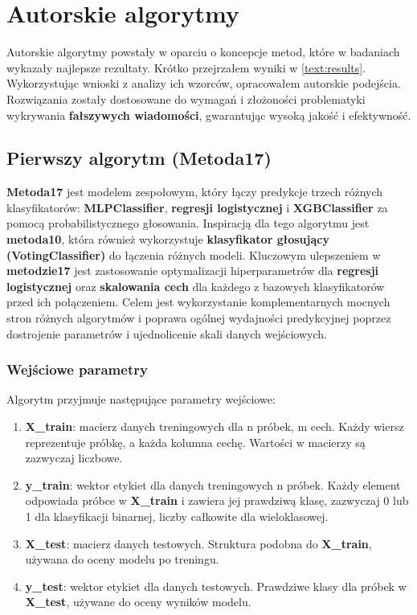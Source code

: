 \chapter{Autorskie algorytmy}
Autorskie algorytmy powstały w oparciu o koncepcje metod, które w badaniach wykazały najlepsze rezultaty. Krótko przejrzałem wyniki w \ref{text:results}. Wykorzystując wnioski z analizy ich wzorców, opracowałem autorskie podejścia. Rozwiązania zostały dostosowane do wymagań i złożoności problematyki wykrywania \textbf{fałszywych wiadomości}, gwarantując wysoką jakość i efektywność.

\section{Pierwszy algorytm (\textbf{Metoda17})}
\textbf{Metoda17} jest modelem zespołowym, który łączy predykcje trzech różnych klasyfikatorów: \textbf{MLPClassifier}, \textbf{regresji logistycznej} i \textbf{XGBClassifier} za pomocą probabilistycznego głosowania. Inspiracją dla tego algorytmu jest \textbf{metoda10}, która również wykorzystuje \textbf{klasyfikator głosujący (VotingClassifier)} do łączenia różnych modeli. Kluczowym ulepszeniem w \textbf{metodzie17} jest zastosowanie optymalizacji hiperparametrów dla \textbf{regresji logistycznej} oraz \textbf{skalowania cech} dla każdego z bazowych klasyfikatorów przed ich połączeniem. Celem jest wykorzystanie komplementarnych mocnych stron różnych algorytmów i poprawa ogólnej wydajności predykcyjnej poprzez dostrojenie parametrów i ujednolicenie skali danych wejściowych.

\subsection{Wejściowe parametry}
Algorytm przyjmuje następujące parametry wejściowe:

\begin{enumerate}
	\def\labelenumi{\arabic{enumi}.}
	\item \textbf{X\_train}: macierz danych treningowych dla n próbek, m cech. Każdy wiersz reprezentuje próbkę, a każda kolumna cechę. Wartości w macierzy są zazwyczaj liczbowe.
	\item \textbf{y\_train}: wektor etykiet dla danych treningowych n próbek. Każdy element odpowiada próbce w \textbf{X\_train} i zawiera jej prawdziwą klasę, zazwyczaj 0 lub 1 dla klasyfikacji binarnej, liczby całkowite dla wieloklasowej.
	\item \textbf{X\_test}: macierz danych testowych. Struktura podobna do \textbf{X\_train}, używana do oceny modelu po treningu.
	\item \textbf{y\_test}: wektor etykiet dla danych testowych. Prawdziwe klasy dla próbek w \textbf{X\_test}, używane do oceny wyników modelu.
\end{enumerate}

